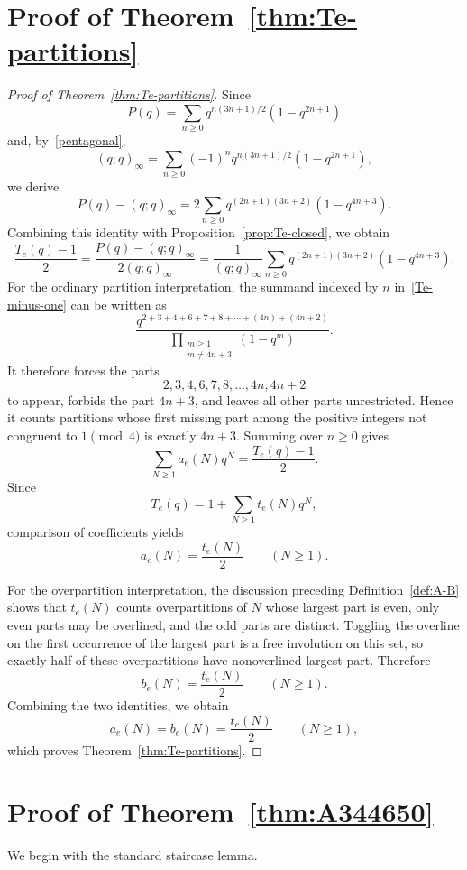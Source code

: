 \documentclass[reqno]{amsart}
\theoremstyle{plain}
\theoremstyle{definition}
\theoremstyle{remark}
\numberwithin{equation}{section}
\newcommand{\qpoch}[2]{(#1;#2)_\infty}
\begin{document}
\section{Proof of Theorem~\ref{thm:Te-partitions}}\label{sec:proof-Te-part}
\begin{proof}[Proof of Theorem~\ref{thm:Te-partitions}]
Since
\[
P(q)=\sum_{n\ge 0} q^{n(3n+1)/2}(1-q^{2n+1})
\]
and, by~\eqref{pentagonal},
\[
(q;q)_\infty =\sum_{n\ge 0}(-1)^n q^{n(3n+1)/2}(1-q^{2n+1}),
\]
we derive
\[
P(q)-\qpoch{q}{q}
=2\sum_{n\ge 0} q^{(2n+1)(3n+2)}(1-q^{4n+3}).
\]
Combining this identity with Proposition~\ref{prop:Te-closed}, we obtain
\begin{equation}\label{Te-minus-one}
\frac{T_e(q)-1}{2}
=\frac{P(q)-\qpoch{q}{q}}{2\qpoch{q}{q}}
=\frac{1}{\qpoch{q}{q}}
\sum_{n\ge 0} q^{(2n+1)(3n+2)}(1-q^{4n+3}).
\end{equation}
For the ordinary partition interpretation, the summand indexed by $n$ in~\eqref{Te-minus-one} can be written as
\[
\frac{q^{2+3+4+6+7+8+\cdots +(4n)+(4n+2)}}{\prod_{\substack{m\ge 1\\ m\ne 4n+3}}(1-q^m)}.
\]
It therefore forces the parts
\[
2,3,4,6,7,8,\dots,4n,4n+2
\]
to appear, forbids the part $4n+3$, and leaves all other parts unrestricted. Hence it counts partitions whose first missing part among the positive integers not congruent to $1\pmod{4}$ is exactly $4n+3$. Summing over $n\ge 0$ gives
\[
\sum_{N\ge 1} a_e(N)q^N=\frac{T_e(q)-1}{2}.
\]
Since
\[
T_e(q)=1+\sum_{N\ge 1} t_e(N)q^N,
\]
comparison of coefficients yields
\[
a_e(N)=\frac{t_e(N)}{2}\qquad(N\ge 1).
\]

For the overpartition interpretation, the discussion preceding Definition~\ref{def:A-B} shows that $t_e(N)$ counts overpartitions of $N$ whose largest part is even, only even parts may be overlined, and the odd parts are distinct. Toggling the overline on the first occurrence of the largest part is a free involution on this set, so exactly half of these overpartitions have nonoverlined largest part. Therefore
\[
b_e(N)=\frac{t_e(N)}{2}\qquad(N\ge 1).
\]
Combining the two identities, we obtain
\[
a_e(N)=b_e(N)=\frac{t_e(N)}{2}\qquad(N\ge 1),
\]
which proves Theorem~\ref{thm:Te-partitions}.
\end{proof}
%
\section{Proof of Theorem~\ref{thm:A344650}}\label{sec:proof-A344650}

We begin with the standard staircase lemma.
\end{document}
